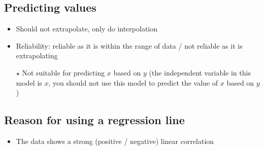 \subsection{Predicting values}
\begin{itemize}
    \item Should not extrapolate, only do interpolation
    \item Reliability: reliable as it is within the range of data / not reliable as it is extrapolating
    \item[$\star$] Not suitable for predicting $x$ based on $y$ (the independent variable in this model is $x$, you should not use this model to predict the value of $x$ based on $y$)
\end{itemize}

\subsection{Reason for using a regression line}
\begin{itemize}
    \item The data shows a strong (positive / negative) linear correlation
\end{itemize}
